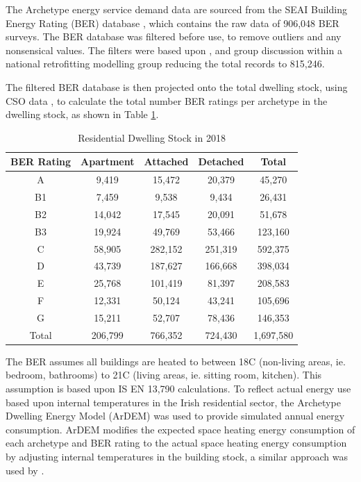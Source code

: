 \documentclass[journal abbreviation, manuscript]{copernicus}
\begin{document}
The Archetype energy service demand data are sourced from the SEAI Building Energy Rating (BER) database \cite{SustainableEnergyAuthorityofIreland}, which contains the raw data of 906,048 BER surveys. The BER database was filtered before use, to remove outliers and any nonsensical values. The filters were based upon \citet{Dineen2015}, \citet{Uidhir2020a} and group discussion within a national retrofitting modelling group \cite{NationalRetrofittingModellingGroup} reducing the total records to 815,246.

The filtered BER database is then projected onto the total dwelling stock, using CSO data \cite{CentralStatisticsOffice2020a} , \cite{CentralStatisticsOffice2020b} to calculate the total number BER ratings per archetype in the dwelling stock, as shown in Table \ref{Residential Dwelling Stock}. 

\begin{table}[h!]
 \centering
 \footnotesize
 \caption{Residential Dwelling Stock in 2018}
 \begin{tabular}{ccccc}
 \hline 
 BER Rating & Apartment & Attached & Detached & Total \\ 
 \hline
 A & 9,419 &	15,472 &	20,379 &	45,270 \\
 B1 & 7,459 &	9,538 &	9,434 &	26,431 \\
 B2	& 14,042 &	17,545 &	20,091 &	51,678 \\
 B3 & 19,924 &	49,769 &	53,466 &	123,160 \\
 C & 58,905	& 282,152 &	251,319	& 592,375 \\
 D & 43,739 &	187,627 &	166,668	& 398,034 \\
 E & 25,768 &	101,419 & 	81,397 & 	208,583 \\
 F & 12,331 &	50,124 &	43,241 &	105,696 \\
 G & 15,211 &	52,707 &	78,436 &	146,353 \\
 Total & 206,799 &	766,352	& 724,430 &	1,697,580 \\ \hline 
 \end{tabular}
 \label{Residential Dwelling Stock}
\end{table}

The BER assumes all buildings are heated to between 18\textdegree C (non-living areas, ie. bedroom, bathrooms) to 21\textdegree C (living areas, ie. sitting room, kitchen). This assumption is based upon IS EN 13,790 calculations. To reflect actual energy use based upon internal temperatures in the Irish residential sector, the Archetype Dwelling Energy Model (ArDEM) \cite{Dineen2015} was used to provide simulated annual energy consumption. ArDEM modifies the expected space heating energy consumption of each archetype and BER rating to the actual space heating energy consumption by adjusting internal temperatures in the building stock, a similar approach was used by \citet{Uidhir2020}.
\end{document}
